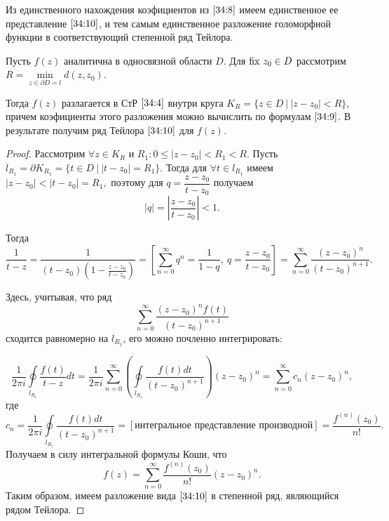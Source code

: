 \documentclass[../../main.tex]{subfiles}
\begin{document}
Из единственного нахождения коэфициентов из $ \eqref{34:8} $ имеем 
единственное ее представление $ \eqref{34:10} $, и тем самым единственное 
разложение голоморфной функции в соответствующий степенной ряд Тейлора.

\begin{thm}
	Пусть $ f(z) $ аналитична в односвязной области $ D $. Для $ \operatorname{fix}\, z_0 \in D 
	$ рассмотрим $ R = \underset{z \in \partial D = l}{\min}d(z, z_0) $.
	
	Тогда $ f(z) $ разлагается в СтР $ \eqref{34:4} $ внутри круга $ K_R = \{z 
	\in D\ |\ |z - z_0| < R \} $, причем коэфициенты этого разложения можно 
	вычислить по формулам $ \eqref{34:9} $.
	В результате получим ряд Тейлора $ \eqref{34:10} $ для $f(z)$.
\end{thm}

\begin{proof}
	Рассмотрим $ \forall z \in K_R $ и $R_1 : 0 \le |z - z_0| < R_1 < R$.
	Пусть $ l_{R_1} = \partial K_{R_1} = \{t \in D\ |\ |t - z_0| = R_1 \} $. 
	Тогда для $ \forall t \in l_{R_1} $ имеем
	$ |z - z_0| < |t - z_0| = R_1, $
	поэтому для $ q = \dfrac{z - z_0}{t - z_0} $ получаем
	\[ |q| = \left|\frac{z - z_0}{t - z_0}\right| < 1. \]
	
	Тогда
	\[ \frac{1}{t - z} = \frac{1}{(t - z_0)(1 - \frac{z - z_0}{t - z_0})} = 
	\left[ \sum\limits_{n = 0}^{\infty}q^n = \frac{1}{1 - q},\ q = \frac{z - 
	z_0}{t - z_0} \right] = \sum\limits_{n = 0}^{\infty}\frac{(z - z_0)^n}{(t - 
	z_0)^{n + 1}}. \]
	
	Здесь, учитывая, что ряд
	\[ \sum\limits_{n = 0}^{\infty}\frac{(z - z_0)^n f(t)}{(t - z_0)^{n + 1}} \]
	сходится равномерно на $ l_{R_1} $, его можно почленно интегрировать:
	
	\[ \frac{1}{2 \pi i} \underset{l_{R_1}}\oint \frac{f(t)}{t - z} dt = 
	\frac{1}{2 \pi i} \sum\limits_{n = 0}^{\infty} \left( 
	\underset{l_{R_1}}\oint\frac{f(t)dt}{(t - z_0)^{n + 1}} \right)(z - z_0)^n = 
	\sum\limits_{n = 0}^{\infty} c_n (z - z_0)^n, \]
	где
	\[ c_n = \frac{1}{2 \pi i} \underset{l_{R_1}}\oint\frac{f(t)dt}{(t - z_0)^{n 
	+ 
	1}} = [\text{интегральное представление производной}] = 
	\frac{f^{(n)}(z_0)}{n!}. \]
	Получаем в силу интегральной формулы Коши, что
	\[ f(z) = \sum\limits_{n = 0}^{\infty} \frac{f^{(n)}(z_0)}{n!} (z - z_0)^n. \]
	Таким образом, имеем разложение вида $ \eqref{34:10} $ в степенной ряд, 
	являющийся рядом 
	Тейлора.
 \end{proof}
\end{document}
